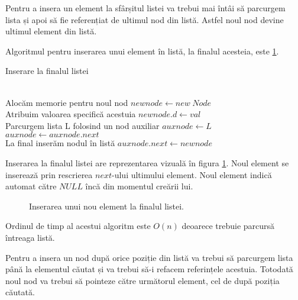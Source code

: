 Pentru a insera un element la sfârșitul listei va trebui mai întâi să parcurgem lista și apoi să fie referențiat de ultimul nod din listă. Astfel noul nod devine ultimul element din listă.

Algoritmul pentru inserarea unui element în listă, la finalul acesteia, este  \ref{fig:insertend}.

\begin{algorithm}[H]
	\caption{Inserare la finalul listei}\label{alg:insertend}
	\begin{algorithmic}[1]
		 \\		
		\Comment Alocăm memorie pentru noul nod \hfill \tab{}\tab{}\tab{}
		\State $newnode \gets new \hspace{3pt} Node$\\
		\Comment Atribuim valoarea specifică acestuia \hfill \tab{}\tab{}\tab{}
		\State $newnode.d \gets val$\\
		\Comment Parcurgem lista L folosind un nod auxiliar  \hfill \tab{}\tab{}
		\State $auxnode \gets L$
		\While {$auxnode.next \neq  NULL$}
		\State $auxnode \gets auxnode.next$
		\EndWhile 	\\
		\Comment La final inserăm nodul în listă  \hfill \tab{}\tab{}\tab{}	
		\State $auxnode.next \gets newnode$
		\EndProcedure
	\end{algorithmic}
\end{algorithm}

Inserarea la finalul listei are reprezentarea vizuală în figura \ref{fig:insertend}. Noul element se inserează prin rescrierea $next$-ului ultimului element. Noul element indică automat către $NULL$ încă din momentul creării lui.


\begin{figure}[H] 
	\centering	
	{
	}
	\caption{Inserarea unui nou element la finalul listei.} 
	\label{fig:insertend}
\end{figure}

Ordinul de timp al acestui algoritm este $O(n)$ deoarece trebuie parcursă întreaga listă.

Pentru a insera un nod după orice poziție din listă va trebui să parcurgem lista până la elementul căutat și va trebui să-i refacem referințele acestuia. Totodată noul nod va trebui să pointeze către următorul element, cel de după poziția căutată.

